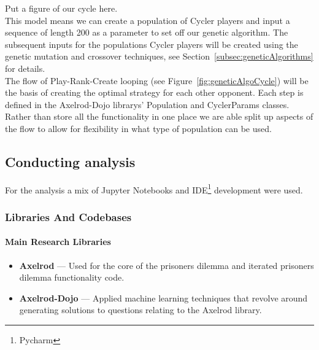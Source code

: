 Put a figure of our cycle here.\label{fig:geneticAlgoCycle} \\

This model means we can create a population of Cycler players and input a sequence of length 200 as a parameter to set off our genetic algorithm.
The subsequent inputs for the populations Cycler players will be created using the genetic mutation and crossover techniques, see Section~\ref{subsec:geneticAlgorithms} for details.\\

The flow of Play-Rank-Create looping (see Figure~\ref{fig:geneticAlgoCycle}) will be the basis of creating the optimal strategy for each other opponent.
Each step is defined in the Axelrod-Dojo librarys' Population and CyclerParams classes.
Rather than store all the functionality in one place we are able split up aspects of the flow to allow for flexibility in what type of population can be used.

\subsection{Conducting analysis}\label{subsec:conductingAnalysis}
For the analysis a mix of Jupyter Notebooks and IDE\footnote{Pycharm} development were used.

\subsubsection{Libraries And Codebases}
\paragraph{Main Research Libraries}
\begin{itemize}
    \item \textbf{Axelrod} --- Used for the core of the prisoners dilemma and iterated prisoners dilemma functionality code.
    \item \textbf{Axelrod-Dojo} --- Applied machine learning techniques that revolve around generating solutions to questions relating to the Axelrod library.
\end{itemize}

